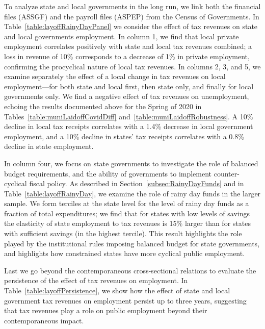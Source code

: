 To analyze state and local governments in the long run, we link both the financial files (ASSGF) and the payroll files (ASPEP) from the Census of Governments. 
In Table~\ref{table:layoffRainyDayPanel} we consider the effect of tax revenues on state and local governments employment. 
In column 1, we find that local private employment correlates positively with state and local tax revenues combined; a loss in revenue of 10\% corresponds to a decrease of 1\% in private employment, confirming the procyclical nature of local tax revenues.
In columns 2, 3, and 5, we examine separately the effect of a local change in tax revenues on local employment---for both state and local first, then state only, and finally for local governments only. 
We find a negative effect of tax revenues on unemployment, echoing the results documented above for the Spring of 2020 in Tables~\ref{table:muniLaidoffCovidDiff} and~\ref{table:muniLaidoffRobustness}. 
A 10\% decline in local tax receipts correlates with a 1.4\% decrease in local government employment, and a 10\% decline in states' tax receipts correlates with a 0.8\% decline in state employment. 

In column four, we focus on state governments to investigate the role of balanced budget requirements, and the ability of governments to implement counter-cyclical fiscal policy.
As described in Section~\ref{subsec:RainyDayFunds} and in Table~\ref{table:layoffRainyDay}, we examine the role of rainy day funds in the larger sample.
We form terciles at the state level for the level of rainy day funds as a fraction of total expenditures; we find that for states with low levels of savings the elasticity of state employment to tax revenues is 15\% larger than for states with sufficient savings (in the highest tercile). 
This result highlights the role played by the institutional rules imposing balanced budget for state governments, and highlights how constrained states have more cyclical public employment. 

Last we go beyond the contemporaneous cross-sectional relations to evaluate the persistence of the effect of tax revenues on employment. 
In Table~\ref{table:layoffPersistence}, we show how the effect of state and local government tax revenues on employment persist up to three years, suggesting that tax revenues play a role on public employment beyond their contemporaneous impact. 



\clearpage

